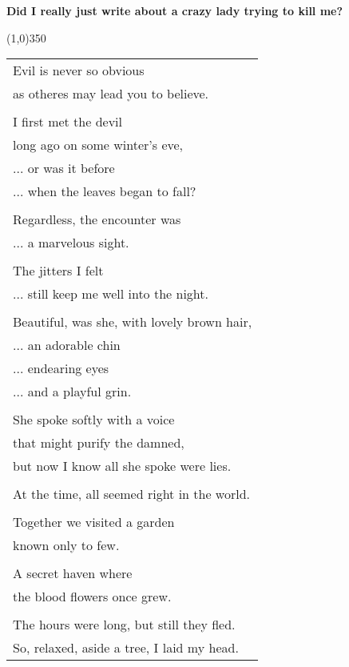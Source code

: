 \documentclass{article}
\begin{document}
\newcommand{\h}{\hspace{3ex}}
\newcommand{\hoar}{%
\begin{center}
\line(1,0){350}
\end{center}
}

\begin{center}
\textbf{Did I really just write about a crazy lady trying to kill me?}
\hoar
\begin{tabular}{l}
Evil is never so obvious \\
\h as otheres may lead you to believe. \\
\\
I first met the devil \\
\h long ago on some winter's eve, \\
\h ... or was it before \\
\h ... when the leaves began to fall? \\
\\
Regardless, the encounter was \\
\h ... a marvelous sight. \\
\\
The jitters I felt \\
\h ... still keep me well into the night. \\
\\
Beautiful, was she, with lovely brown hair, \\
\h ... an adorable chin \\
\h ... endearing eyes \\
\h ... and a playful grin. \\
\\
She spoke softly with a voice \\
\h that might purify the damned, \\
\h but now I know all she spoke were lies. \\
\\
At the time, all seemed right in the world. \\
\\
Together we visited a garden \\
\h known only to few. \\
\\
A secret haven where \\
\h the blood flowers once grew. \\
\\
The hours were long, but still they fled. \\
So, relaxed, aside a tree, I laid my head. \\

\end{tabular}
\end{center}
\end{document}
